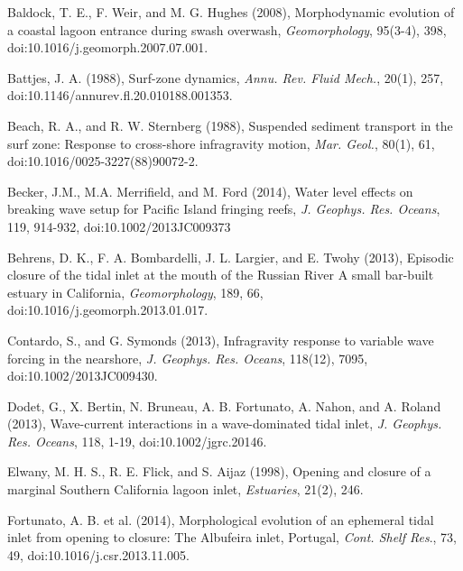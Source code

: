 

\begin{thebibliography}
Baldock,
T. E., F. Weir, and M. G. Hughes (2008), Morphodynamic evolution of
a coastal lagoon entrance during swash overwash, \emph{Geomorphology},
95(3-4), 398, doi:10.1016/j.geomorph.2007.07.001.

Battjes, J. A. (1988),
Surf-zone dynamics, \emph{Annu. Rev. Fluid Mech.}, 20(1), 257,
doi:10.1146/annurev.fl.20.010188.001353. 

Beach,
R. A., and R. W. Sternberg (1988), Suspended sediment transport in
the surf zone: Response to cross-shore infragravity motion, \emph{Mar.
Geol.}, 80(1), 61, doi:10.1016/0025-3227(88)90072-2. 

Becker, J.M.,
M.A. Merrifield, and M. Ford (2014), Water level effects on breaking
wave setup for Pacific Island fringing reefs, \emph{J. Geophys. Res.
Oceans}, 119, 914-932, doi:10.1002/2013JC009373

Behrens,
D. K., F. A. Bombardelli, J. L. Largier, and E. Twohy (2013), Episodic
closure of the tidal inlet at the mouth of the Russian River \textemdash{}
A small bar-built estuary in California, \emph{Geomorphology}, 189,
66, doi:10.1016/j.geomorph.2013.01.017. 

Contardo,
S., and G. Symonds (2013), Infragravity response to variable wave
forcing in the nearshore, \emph{J. Geophys. Res. Oceans}, 118(12),
7095, doi:10.1002/2013JC009430. 

Dodet, G.,
X. Bertin, N. Bruneau, A. B. Fortunato, A. Nahon, and A. Roland (2013),
Wave-current interactions in a wave-dominated tidal inlet, \emph{J.
Geophys. Res. Oceans}, 118, 1-19, doi:10.1002/jgrc.20146.

Elwany, M.
H. S., R. E. Flick, and S. Aijaz (1998), Opening and closure of a
marginal Southern California lagoon inlet, \emph{Estuaries}, 21(2),
246. 

Fortunato,
A. B. et al. (2014), Morphological evolution of an ephemeral tidal
inlet from opening to closure: The Albufeira inlet, Portugal, \emph{Cont.
Shelf Res}., 73, 49, doi:10.1016/j.csr.2013.11.005.


\end{thebibliography}
